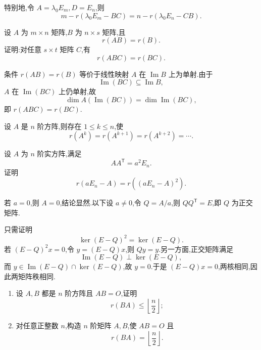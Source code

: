\begin{corollary}[\markstar]
特别地,令 $A=\lambda_0E_m,D=E_n$,则
\[
 m-r(\lambda_0E_m-BC)
 =n-r(\lambda_0E_n-CB).
\]
\end{corollary}

\begin{example}[\markstar]
设 $A$ 为 $m\times n$ 矩阵,$B$ 为 $n\times s$ 矩阵,且
\[
 r(AB)=r(B).
\]
证明:对任意 $s\times t$ 矩阵 $C$,有
\[
 r(ABC)=r(BC).
\]
\end{example}
\exampleblank

\begin{solution}
条件 $r(AB)=r(B)$ 等价于线性映射 $A$ 在 $\operatorname{Im}B$ 上为单射.由于
\[
 \operatorname{Im}(BC)\subseteq\operatorname{Im}B,
\]
$A$ 在 $\operatorname{Im}(BC)$ 上仍单射,故
\[
 \dim A(\operatorname{Im}(BC))=\dim\operatorname{Im}(BC),
\]
即 $r(ABC)=r(BC)$.
\end{solution}

\begin{proposition}[\marktwostar]
设 $A$ 是 $n$ 阶方阵,则存在 $1\leq k\leq n$,使
\[
 r(A^k)=r(A^{k+1})=r(A^{k+2})=\cdots.
\]
\end{proposition}

\begin{example}
设 $A$ 为 $n$ 阶实方阵,满足
\[
 AA^{\mathsf T}=a^2E_n.
\]
证明
\[
 r(aE_n-A)=r((aE_n-A)^2).
\]
\end{example}
\exampleblank

\begin{solution}
若 $a=0$,则 $A=0$,结论显然.以下设 $a\neq0$,令 $Q=A/a$,则 $QQ^{\mathsf T}=E$,即 $Q$ 为正交矩阵.

只需证明
\[
 \ker(E-Q)^2=\ker(E-Q).
\]
若 $(E-Q)^2x=0$,令 $y=(E-Q)x$,则 $Qy=y$.另一方面,正交矩阵满足
\[
 \operatorname{Im}(E-Q)\perp\ker(E-Q),
\]
而 $y\in\operatorname{Im}(E-Q)\cap\ker(E-Q)$,故 $y=0$.于是 $(E-Q)x=0$,两核相同,因此两矩阵秩相同.
\end{solution}

\begin{example}
\begin{enumerate}
  \item 设 $A,B$ 都是 $n$ 阶方阵且 $AB=O$,证明
  \[
  r(BA)\leq\left\lfloor\dfrac n2\right\rfloor;
  \]
  \item 对任意正整数 $n$,构造 $n$ 阶矩阵 $A,B$,使 $AB=O$ 且
  \[
  r(BA)=\left\lfloor\dfrac n2\right\rfloor.
  \]
\end{enumerate}
\end{example}
\exampleblank

